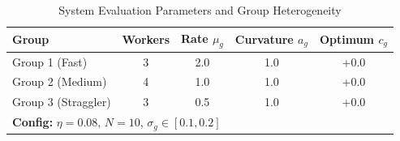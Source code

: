 \begin{table}[t]
\centering
\caption{System Evaluation Parameters and Group Heterogeneity}
\label{tab:system_parameters}
\begin{tabular}{lcccc}
\toprule
\textbf{Group} & \textbf{Workers} & \textbf{Rate $\mu_g$} & \textbf{Curvature $a_g$} & \textbf{Optimum $c_g$} \\
\midrule
Group 1 (Fast) & 3 & 2.0 & 1.0 & +0.0 \\
Group 2 (Medium) & 4 & 1.0 & 1.0 & +0.0 \\
Group 3 (Straggler) & 3 & 0.5 & 1.0 & +0.0 \\
\midrule
\multicolumn{5}{l}{\textbf{Config:} $\eta=0.08$, $N=10$, $\sigma_g \in [0.1, 0.2]$} \\
\bottomrule
\end{tabular}
\end{table}
